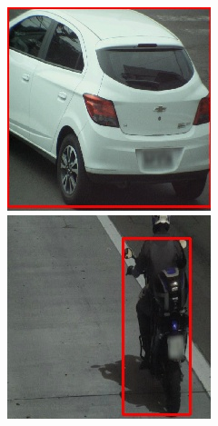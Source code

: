 \documentclass[12pt,oneside]{memoir}
\begin{document}
\begin{figure}
    \centering
    \begin{subfigure}[b]{0.35\textwidth}
        \includegraphics[width=\textwidth]{matfmaster/vgg16_base/car_real.jpg}
        \includegraphics[width=\textwidth]{matfmaster/vgg16_base/motorbike_real.jpg}

\end{subfigure}
\end{figure}
\end{document}
